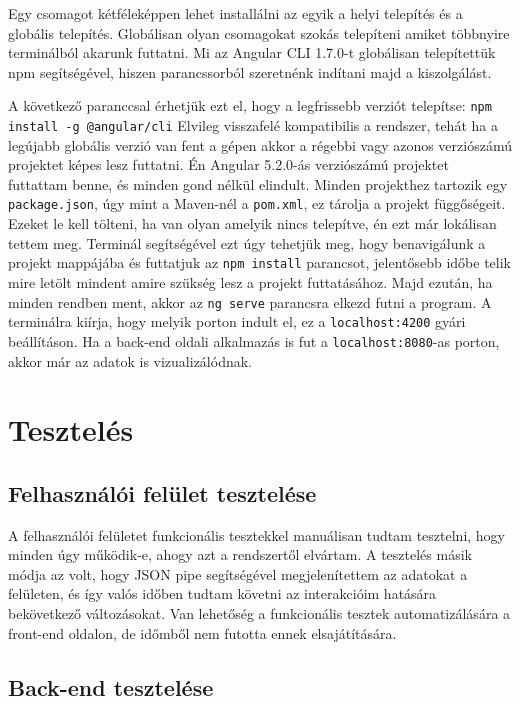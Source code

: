 Egy csomagot kétféleképpen lehet installálni az egyik a helyi telepítés és a globális telepítés. Globálisan olyan csomagokat szokás telepíteni amiket többnyire terminálból akarunk futtatni.
Mi az Angular CLI 1.7.0-t globálisan telepítettük npm segítségével, hiszen parancssorból szeretnénk indítani majd a kiszolgálást.

A következő paranccsal érhetjük ezt el, hogy a legfrissebb verziót telepítse: \texttt{npm install -g @angular/cli}
Elvileg visszafelé kompatibilis a rendszer, tehát ha a legújabb globális verzió van fent a gépen akkor a régebbi vagy azonos verziószámú projektet képes lesz futtatni. Én Angular 5.2.0-ás verziószámú projektet futtattam benne, és minden gond nélkül elindult.
Minden projekthez tartozik egy \texttt{package.json}, úgy mint a Maven-nél a \texttt{pom.xml}, ez tárolja a projekt függőségeit. Ezeket le kell tölteni, ha van olyan amelyik nincs telepítve, én ezt már lokálisan tettem meg. Terminál segítségével ezt úgy tehetjük meg, hogy benavigálunk a projekt mappájába és futtatjuk az \texttt{npm install} parancsot, jelentősebb időbe telik mire letölt mindent amire szükség lesz a projekt futtatásához. Majd ezután, ha minden rendben ment, akkor az \texttt{ng serve} parancsra elkezd futni a program. A terminálra kiírja, hogy melyik porton indult el, ez a \texttt{localhost:4200} gyári beállításon. Ha a back-end oldali alkalmazás is fut a \texttt{localhost:8080}-as porton, akkor már az adatok is vizualizálódnak.

\section{Tesztelés}

\subsection{Felhasználói felület tesztelése}
A felhasználói felületet funkcionális tesztekkel manuálisan tudtam tesztelni, hogy minden úgy működik-e, ahogy azt a rendszertől elvártam. A tesztelés másik módja az volt, hogy JSON pipe segítségével megjelenítettem az adatokat a felületen, és így valós időben tudtam követni az interakcióim hatására bekövetkező változásokat. Van lehetőség a funkcionális tesztek automatizálására a front-end oldalon, de időmből nem futotta ennek elsajátítására.

\subsection{Back-end tesztelése}

